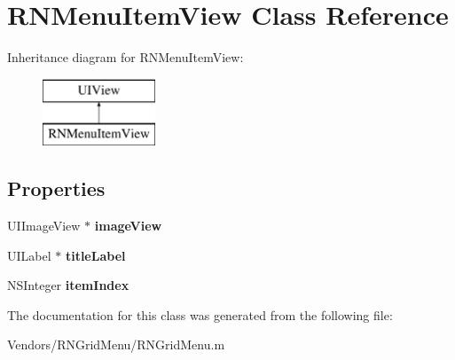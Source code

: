 \hypertarget{interface_r_n_menu_item_view}{}\section{R\+N\+Menu\+Item\+View Class Reference}
\label{interface_r_n_menu_item_view}
Inheritance diagram for R\+N\+Menu\+Item\+View\+:\begin{figure}[H]
\begin{center}
\leavevmode
\includegraphics[height=2.000000cm]{interface_r_n_menu_item_view}
\end{center}
\end{figure}
\subsection*{Properties}
\begin{DoxyCompactItemize}
\item 
\hypertarget{interface_r_n_menu_item_view_abd85886b7f6673e914a414c89bf8030b}{}U\+I\+Image\+View $\ast$ {\bfseries image\+View}\label{interface_r_n_menu_item_view_abd85886b7f6673e914a414c89bf8030b}

\item 
\hypertarget{interface_r_n_menu_item_view_aa2eaf511a6f3ea2d4b5178c26e4dc010}{}U\+I\+Label $\ast$ {\bfseries title\+Label}\label{interface_r_n_menu_item_view_aa2eaf511a6f3ea2d4b5178c26e4dc010}

\item 
\hypertarget{interface_r_n_menu_item_view_af19f6be96ada29e5d8e72f16d4bbe8de}{}N\+S\+Integer {\bfseries item\+Index}\label{interface_r_n_menu_item_view_af19f6be96ada29e5d8e72f16d4bbe8de}

\end{DoxyCompactItemize}


The documentation for this class was generated from the following file\+:\begin{DoxyCompactItemize}
\item 
Vendors/\+R\+N\+Grid\+Menu/R\+N\+Grid\+Menu.\+m\end{DoxyCompactItemize}
